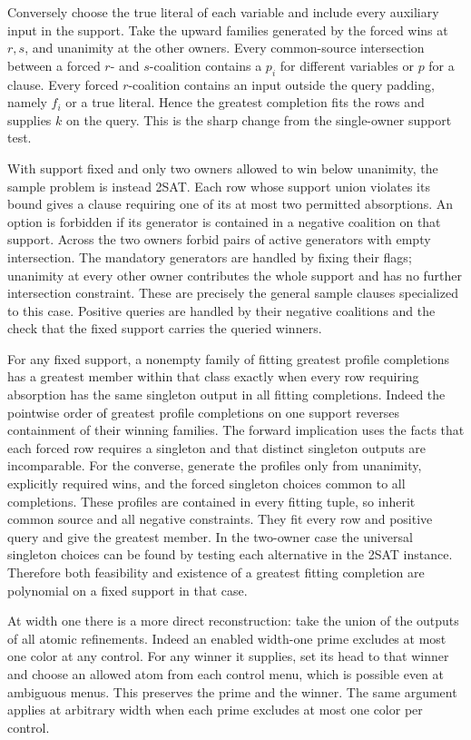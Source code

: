 Conversely choose the true literal of each variable and
include every auxiliary input in the support. Take the
upward families generated by the forced wins at $r,s$,
and unanimity at the other owners. Every common-source
intersection between a forced $r$- and $s$-coalition
contains a $p_i$ for different variables or $p$ for a
clause. Every forced $r$-coalition contains an input
outside the query padding, namely $f_i$ or a true literal.
Hence the greatest completion fits the rows and supplies
$k$ on the query. This is the sharp change from the
single-owner support test.

With support fixed and only two owners allowed to win
below unanimity, the sample problem is instead 2SAT.
Each row whose support union violates its bound gives
a clause requiring one of its at most two permitted
absorptions. An option is forbidden if its generator
is contained in a negative coalition on that support.
Across the two owners forbid pairs of active generators
with empty intersection. The mandatory generators are
handled by fixing their flags; unanimity at every other
owner contributes the whole support and has no further
intersection constraint. These are precisely the general
sample clauses specialized to this case. Positive queries
are handled by their negative coalitions and the check
that the fixed support carries the queried winners.

For any fixed support, a nonempty family of fitting
greatest profile completions has a greatest member
within that class exactly when every row requiring
absorption has the same singleton output in all fitting
completions. Indeed the pointwise order of greatest
profile completions on one support reverses containment
of their winning families. The forward implication uses
the facts that each forced row requires a singleton and
that distinct singleton outputs are incomparable.
For the converse, generate the profiles only from
unanimity, explicitly required wins, and the forced
singleton choices common to all completions. These
profiles are contained in every fitting tuple, so inherit
common source and all negative constraints. They
fit every row and positive query and give the greatest
member. In the two-owner case the universal singleton
choices can be found by testing each alternative in the
2SAT instance. Therefore both feasibility and existence
of a greatest fitting completion are polynomial on a
fixed support in that case.

At width one there is a more direct reconstruction: take
the union of the outputs of all atomic refinements. Indeed
an enabled width-one prime excludes at most one color at
any control. For any winner it supplies, set its head to
that winner and choose an allowed atom from each control
menu, which is possible even at ambiguous menus. This
preserves the prime and the winner. The same argument
applies at arbitrary width when each prime excludes at
most one color per control.

